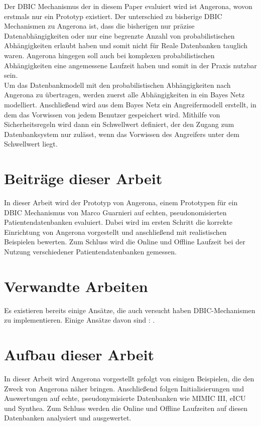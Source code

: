 \documentclass[german,version-2020-11]{uzl-thesis}
\begin{document}
Der DBIC Mechanismus der in diesem Paper evaluiert wird ist Angerona, wovon erstmals nur ein Prototyp existiert. Der unterschied zu bisherige DBIC Mechanismen zu Angerona ist, dass die bisherigen nur präzise Datenabhängigkeiten oder nur eine begrenzte Anzahl von probabilistischen Abhängigkeiten erlaubt haben und somit nicht für Reale Datenbanken tauglich waren. Angerona hingegen soll auch bei komplexen probabilistischen Abhängigkeiten eine angemessene Laufzeit haben und somit in der Praxis nutzbar sein. \\
Um das Datenbankmodell mit den probabilistischen Abhängigkeiten nach Angerona zu übertragen, werden zuerst alle Abhängigkeiten in ein Bayes Netz modelliert. Anschließend wird aus dem Bayes Netz ein Angreifermodell erstellt, in dem das Vorwissen von jedem Benutzer gespeichert wird. Mithilfe von Sicherheitsregeln wird dann ein Schwellwert definiert, der den Zugang zum Datenbanksystem nur zulässt, wenn das Vorwissen des Angreifers unter dem Schwellwert liegt.
\todo[inline, size=\tiny]{gehört der letzte Satz überhaupt hier rein??]}



\section{Beiträge dieser Arbeit}
In dieser Arbeit wird der Prototyp von Angerona, einem Prototypen für ein DBIC Mechanismus von Marco Guarnieri auf echten, pseudonomisierten Patientendatenbanken evaluiert. Dabei wird im ersten Schritt  die korrekte Einrichtung von Angerona vorgestellt und anschließend mit realistischen Beispielen bewerten. Zum Schluss wird die Online und Offline Laufzeit bei der Nutzung verschiedener Patientendatenbanken gemessen.


\section{Verwandte Arbeiten}
Es existieren bereits einige Ansätze, die auch versucht haben DBIC-Mechanismen zu implementieren. Einige Ansätze davon sind : . 


\section{Aufbau dieser Arbeit}
In dieser Arbeit wird Angerona vorgestellt gefolgt von einigen Beispielen, die den Zweck von Angerona näher bringen. Anschließend folgen Initialisierungen und Auswertungen auf echte, pseudonymisierte Datenbanken wie MIMIC III, eICU und Synthea. Zum Schluss werden die Online und Offline Laufzeiten auf diesen Datenbanken analysiert und ausgewertet.
\end{document}
